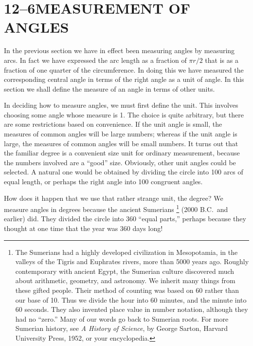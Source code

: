 \documentclass[11pt]{book}
\newcommand{\XIIsymfoot}[1]{%
  \begingroup
  \renewcommand{\thefootnote}{\fnsymbol{footnote}}%
  \setcounter{footnote}{0}%
  \footnote{#1}%
  \endgroup}
\begin{document}
\section*{12--6\quad MEASUREMENT OF ANGLES}

In the previous section we have in effect been measuring angles by measuring
arcs. In fact we have expressed the arc length as a fraction of $\pi r/2$ that
is as a fraction of one quarter of the circumference. In doing this we have
measured the corresponding central angle in terms of the right angle as a unit
of angle. In this section we shall define the measure of an angle in terms of
other units.

In deciding how to measure angles, we must first define the unit. This involves
choosing some angle whose measure is 1. The choice is quite arbitrary, but there
are some restrictions based on convenience. If the unit angle is small, the
measures of common angles will be large numbers; whereas if the unit angle is
large, the measures of common angles will be small numbers. It turns out that
the familiar degree is a convenient size unit for ordinary measurement, because
the numbers involved are a ``good'' size. Obviously, other unit angles could be
selected. A natural one would be obtained by dividing the circle into 100 arcs
of equal length, or perhaps the right angle into 100 congruent angles.

How does it happen that we use that rather strange unit, the degree? We measure
angles in degrees because the ancient Sumerians\XIIsymfoot{The Sumerians had a
highly developed civilization in Mesopotamia, in the valleys of the Tigris and
Euphrates rivers, more than 5000 years ago. Roughly contemporary with ancient
Egypt, the Sumerian culture discovered much about arithmetic, geometry, and
astronomy. We inherit many things from these gifted people. Their method of
counting was based on 60 rather than our base of 10. Thus we divide the hour
into 60 minutes, and the minute into 60 seconds. They also invented place value
in number notation, although they had no ``zero.'' Many of our words go back to
Sumerian roots. For more Sumerian history, see \emph{A History of Science}, by
George Sarton, Harvard University Press, 1952, or your encyclopedia.} (2000
B.C.\ and earlier) did. They divided the circle into 360 ``equal parts,''
perhaps because they thought at one time that the year was 360 days long!
\end{document}
